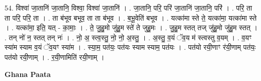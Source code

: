 \documentclass[17pt]{extarticle}
\begin{document}
54. विश्वा॑ जा॒तानि॑ जा॒तानि॒ विश्वा॒ विश्वा॑ जा॒तानि॑ । . जा॒तानि॒ परि॒ परि॑ जा॒तानि॑ जा॒तानि॒ परि॑ । . परि॒ ता ता परि॒ परि॒ ता । . ता ब॑भूव बभूव॒ ता ता ब॑भूव । . ब॒भू॒वेति॑ बभूव । . यत्का॑मा स्ते ते॒ यत्का॑मा॒ यत्का॑मा स्ते । . यत्का॑मा॒ इति॒ यत् - का॒माः॒ । . ते॒ जु॒हु॒मो जु॑हु॒म स्ते॑ ते जुहु॒मः । . जु॒हु॒म स्तत् तज् जु॑हु॒मो जु॑हु॒म स्तत् । . तन् नो॑ न॒ स्तत् तन् नः॑ । . नो॒ अ॒ स्त्व॒स्तु॒ नो॒ नो॒ अ॒स्तु॒ । . अ॒स्तु॒ व॒यं ॅव॒य म॑ स्त्वस्तु व॒यम् । . व॒यꣳ स्या॑म स्याम व॒यं ॅव॒यꣳ स्या॑म । . स्या॒म॒ पत॑यः॒ पत॑यः स्याम स्याम॒ पत॑यः । . पत॑यो रयी॒णाꣳ र॑यी॒णाम् पत॑यः॒ पत॑यो रयी॒णाम् । . र॒यी॒णामिति॑ रयी॒णाम् । \newline

\textbf{Ghana Paata } \newline
\end{document}
